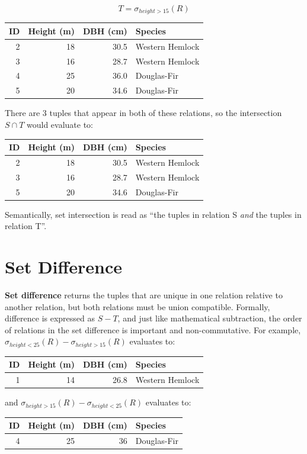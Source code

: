 \documentclass[
]{book}
\begin{document}
\[T = σ_{height>15}(R)\]

\begin{tabular}{rrrl}
\toprule
ID & Height (m) & DBH (cm) & Species\\
\midrule
2 & 18 & 30.5 & Western Hemlock\\
3 & 16 & 28.7 & Western Hemlock\\
4 & 25 & 36.0 & Douglas-Fir\\
5 & 20 & 34.6 & Douglas-Fir\\
\bottomrule
\end{tabular}

There are 3 tuples that appear in both of these relations, so the intersection \(S∩T\) would evaluate to:

\begin{tabular}{rrrl}
\toprule
ID & Height (m) & DBH (cm) & Species\\
\midrule
2 & 18 & 30.5 & Western Hemlock\\
3 & 16 & 28.7 & Western Hemlock\\
5 & 20 & 34.6 & Douglas-Fir\\
\bottomrule
\end{tabular}

Semantically, set intersection is read as ``the tuples in relation S \emph{and} the tuples in relation T''.

\hypertarget{set-difference}{%
\section{Set Difference}\label{set-difference}}

\textbf{Set difference} returns the tuples that are unique in one relation relative to another relation, but both relations must be union compatible. Formally, difference is expressed as \(S-T\), and just like mathematical subtraction, the order of relations in the set difference is important and non-commutative. For example, \(σ_{height<25}(R)-σ_{height>15}(R)\) evaluates to:

\begin{tabular}{rrrl}
\toprule
ID & Height (m) & DBH (cm) & Species\\
\midrule
1 & 14 & 26.8 & Western Hemlock\\
\bottomrule
\end{tabular}

and \(σ_{height>15}(R)-σ_{height<25}(R)\) evaluates to:

\begin{tabular}{rrrl}
\toprule
ID & Height (m) & DBH (cm) & Species\\
\midrule
4 & 25 & 36 & Douglas-Fir\\
\bottomrule
\end{tabular}
\end{document}
